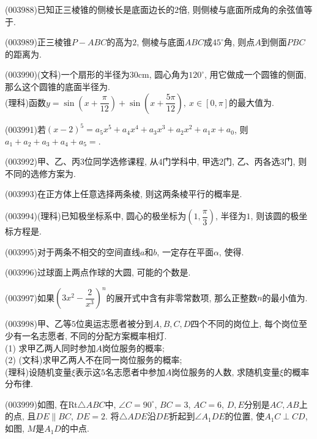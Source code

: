 \item (003988)已知正三棱锥的侧棱长是底面边长的$2$倍, 则侧棱与底面所成角的余弦值等于.
\item (003989)正三棱锥$P-ABC$的高为$2$, 侧棱与底面$ABC$成$45^\circ$角, 则点$A$到侧面$PBC$的距离为.
\item (003990)(文科)一个扇形的半径为$30$cm, 圆心角为$120^\circ$, 用它做成一个圆锥的侧面, 那么这个圆锥的底面半径为.\\
(理科)函数$y=\sin\left(x+\dfrac{\pi}{12}\right)+\sin\left(x+\dfrac{5\pi}{12}\right), \ x\in [0,\pi]$的最大值为.
\item (003991)若$(x-2)^5=a_5x^5+a_4x^4+a_3x^3+a_2x^2+a_1x+a_0$, 则$a_1+a_2+a_3+a_4+a_5=$.
\item (003992)甲、乙、丙$3$位同学选修课程, 从$4$门学科中, 甲选$2$门, 乙、丙各选$3$门, 则不同的选修方案为.
\item (003993)在正方体上任意选择两条棱, 则这两条棱平行的概率是.
\item (003994)(理科)已知极坐标系中, 圆心的极坐标为$\left(1,\dfrac{\pi}{3}\right)$, 半径为$1$, 则该圆的极坐标方程是.
\item (003995)对于两条不相交的空间直线$a$和$b$, 一定存在平面$\alpha$, 使得.
\item (003996)过球面上两点作球的大圆, 可能的个数是.
\item (003997)如果$\left(3x^2-\dfrac{2}{x^3}\right)^n$的展开式中含有非零常数项, 那么正整数$n$的最小值为.
\item (003998)甲、乙等$5$位奥运志愿者被分到$A,B,C,D$四个不同的岗位上, 每个岗位至少有一名志愿者, 不同的分配方案概率相灯.\\
(1) 求甲乙两人同时参加$A$岗位服务的概率;\\
(2) (文科)求甲乙两人不在同一岗位服务的概率;\\
(理科)设随机变量$\xi$表示这$5$名志愿者中参加$A$岗位服务的人数, 求随机变量$\xi$的概率分布律.
\item (003999)如图, 在Rt$\triangle ABC$中, $\angle C=90^\circ$, $BC=3$, $AC=6$, $D,E$分别是$AC,AB$上的点, 且$DE\parallel BC$, $DE=2$. 将$\triangle ADE$沿$DE$折起到$\angle A_1DE$的位置, 使$A_1C\perp CD$, 如图, $M$是$A_1D$的中点.\\
